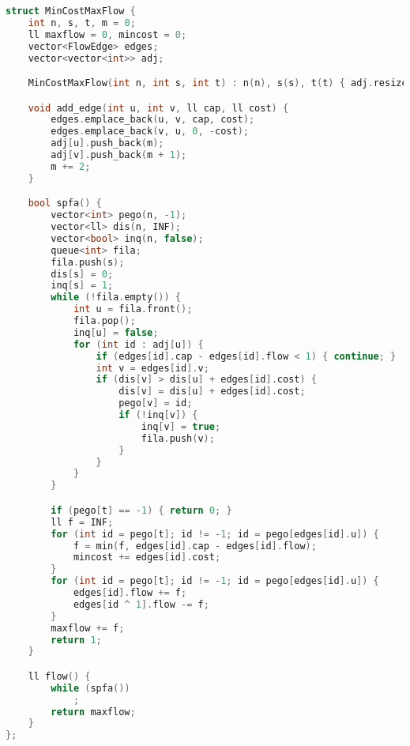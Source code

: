 \documentclass[11pt, a4paper, twoside]{article}
\begin{document}
\begin{lstlisting}[language=C++]
struct MinCostMaxFlow {
    int n, s, t, m = 0;
    ll maxflow = 0, mincost = 0;
    vector<FlowEdge> edges;
    vector<vector<int>> adj;

    MinCostMaxFlow(int n, int s, int t) : n(n), s(s), t(t) { adj.resize(n); }

    void add_edge(int u, int v, ll cap, ll cost) {
        edges.emplace_back(u, v, cap, cost);
        edges.emplace_back(v, u, 0, -cost);
        adj[u].push_back(m);
        adj[v].push_back(m + 1);
        m += 2;
    }

    bool spfa() {
        vector<int> pego(n, -1);
        vector<ll> dis(n, INF);
        vector<bool> inq(n, false);
        queue<int> fila;
        fila.push(s);
        dis[s] = 0;
        inq[s] = 1;
        while (!fila.empty()) {
            int u = fila.front();
            fila.pop();
            inq[u] = false;
            for (int id : adj[u]) {
                if (edges[id].cap - edges[id].flow < 1) { continue; }
                int v = edges[id].v;
                if (dis[v] > dis[u] + edges[id].cost) {
                    dis[v] = dis[u] + edges[id].cost;
                    pego[v] = id;
                    if (!inq[v]) {
                        inq[v] = true;
                        fila.push(v);
                    }
                }
            }
        }

        if (pego[t] == -1) { return 0; }
        ll f = INF;
        for (int id = pego[t]; id != -1; id = pego[edges[id].u]) {
            f = min(f, edges[id].cap - edges[id].flow);
            mincost += edges[id].cost;
        }
        for (int id = pego[t]; id != -1; id = pego[edges[id].u]) {
            edges[id].flow += f;
            edges[id ^ 1].flow -= f;
        }
        maxflow += f;
        return 1;
    }

    ll flow() {
        while (spfa())
            ;
        return maxflow;
    }
};
\end{lstlisting}
\end{document}

